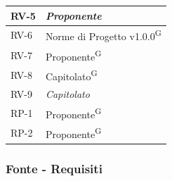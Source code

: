 \documentclass[8pt]{article}
\newcommand{\glossterm}[1]{#1\textsuperscript{G}} %
\begin{document}
\begin{longtable}{|>{\centering\arraybackslash}p{4cm}|>{\centering\arraybackslash}p{4cm}|}
            RV-5 & \textit{Proponente} \\ \hline
            RV-6 & \glossterm{Norme di Progetto v1.0.0} \\ \hline
            RV-7 & \glossterm{Proponente} \\ \hline
            RV-8 & \glossterm{Capitolato} \\ \hline
            RV-9 & \textit{Capitolato} \\ \hline
            RP-1 & \glossterm{Proponente} \\ \hline
            RP-2 & \glossterm{Proponente} \\ \hline
\end{longtable}
\clearpage
\subsubsection{Fonte - Requisiti}
\end{document}
